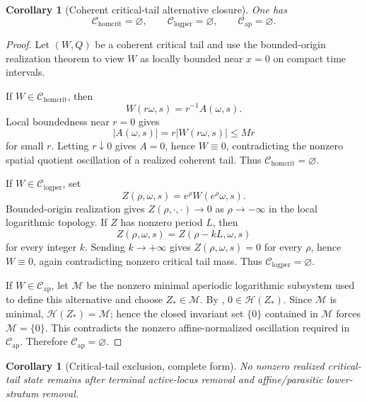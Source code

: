 \documentclass[11pt]{amsart}
\numberwithin{equation}{section}
\theoremstyle{plain}
\newtheorem{corollary}[theorem]{Corollary}
\theoremstyle{definition}
\theoremstyle{remark}
\newcommand{\Chomcrit}{\mathcal C_{\mathrm{homcrit}}}
\newcommand{\Clogper}{\mathcal C_{\mathrm{logper}}}
\newcommand{\Capcrit}{\mathcal C_{\mathrm{ap}}}
\begin{document}
\begin{corollary}[Coherent critical-tail alternative closure]
\label{cor:coherent-critical-tail-branch-closure}
One has
\[
   \Chomcrit=\varnothing,\qquad
   \Clogper=\varnothing,\qquad
   \Capcrit=\varnothing .
\]
\end{corollary}

\begin{proof}
Let \((W,Q)\) be a coherent critical tail and use the bounded-origin realization
theorem to view \(W\) as locally bounded near \(x=0\) on compact time
intervals.

If \(W\in\Chomcrit\), then
\[
   W(r\omega,s)=r^{-1}A(\omega,s).
\]
Local boundedness near \(r=0\) gives
\[
   |A(\omega,s)|=r|W(r\omega,s)|\le Mr
\]
for small \(r\).  Letting \(r\downarrow0\) gives \(A=0\), hence \(W\equiv0\),
contradicting the nonzero spatial quotient oscillation of a realized coherent
tail.  Thus \(\Chomcrit=\varnothing\).

If \(W\in\Clogper\), set
\[
   Z(\rho,\omega,s)=e^\rho W(e^\rho\omega,s).
\]
Bounded-origin realization gives \(Z(\rho,\cdot,\cdot)\to0\) as
\(\rho\to-\infty\) in the local logarithmic topology.  If \(Z\) has nonzero
period \(L\), then
\[
   Z(\rho,\omega,s)=Z(\rho-kL,\omega,s)
\]
for every integer \(k\).  Sending \(k\to+\infty\) gives \(Z(\rho,\omega,s)=0\)
for every \(\rho\), hence \(W\equiv0\), again contradicting nonzero critical
tail mass.  Thus \(\Clogper=\varnothing\).

If \(W\in\Capcrit\), let \(\mathcal M\) be the nonzero minimal aperiodic
logarithmic subsystem used to define this alternative and choose
\(Z_*\in\mathcal M\).  By
, \(0\in\mathcal H(Z_*)\).
Since \(\mathcal M\) is minimal, \(\mathcal H(Z_*)=\mathcal M\); hence the
closed invariant set \(\{0\}\) contained in \(\mathcal M\) forces
\(\mathcal M=\{0\}\).  This contradicts the nonzero affine-normalized
oscillation required in \(\Capcrit\).  Therefore \(\Capcrit=\varnothing\).
\end{proof}

\begin{corollary}[Critical-tail exclusion, complete form]
\label{cor:critical-tail-discharge-complete}
No nonzero realized critical-tail state remains after terminal
active-locus removal and affine/parasitic lower-stratum removal.
\end{corollary}
\end{document}
